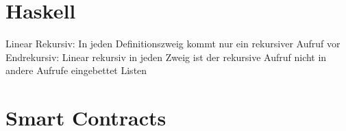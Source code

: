 \documentclass{Zusammenfassung}
\begin{document}
\makeTitleAndTOC
%
%

\section{Haskell}\label{sec:haskell}
Linear Rekursiv: In jeden Definitionszweig kommt nur ein rekursiver Aufruf vor\\
Endrekursiv: Linear rekursiv in jeden Zweig ist  der rekursive Aufruf nicht in andere Aufrufe eingebettet
Listen

\section{Smart Contracts}\label{sec:smart-contracts}
%
%
\end{document}
